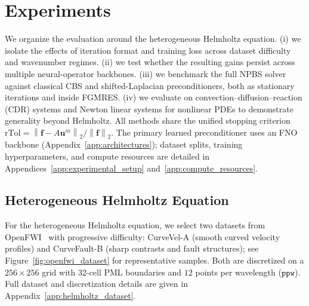 \documentclass{article}
\newcommand{\norm}[1]{\left\lVert #1 \right\rVert_2}
\theoremstyle{plain}
\theoremstyle{remark}
\begin{document}



\section{Experiments}
\label{sec:numerical_results}
We organize the evaluation around the heterogeneous Helmholtz equation. 
(i) we isolate the effects of iteration format and training loss across dataset difficulty and wavenumber regimes. 
(ii) we test whether the resulting gains persist across multiple neural-operator backbones. 
(iii) we benchmark the full NPBS solver against classical CBS and shifted-Laplacian preconditioners, both as stationary iterations and inside FGMRES. 
(iv) we evaluate on convection--diffusion--reaction (CDR) systems and Newton linear systems for nonlinear PDEs to demonstrate generality beyond Helmholtz. 
All methods share the unified stopping criterion $\mathrm{rTol}=\norm{\bm f-A\bm u^m}/\norm{\bm f}$.
The primary learned preconditioner uses an FNO backbone (Appendix~\ref{app:architectures}); dataset splits, training hyperparameters, and compute resources are detailed in Appendices~\ref{app:experimental_setup} and~\ref{app:compute_resources}.

\subsection{Heterogeneous Helmholtz Equation}
\label{sec:exp_heter_helm_eq}
For the heterogeneous Helmholtz equation, we select two datasets from OpenFWI~\cite{deng2022openfwi} with progressive difficulty: CurveVel-A (smooth curved velocity profiles) and CurveFault-B (sharp contrasts and fault structures); see Figure~\ref{fig:openfwi_dataset} for representative samples. Both are discretized on a $256\times256$ grid with 32-cell PML boundaries and $12$ points per wavelength ($\texttt{ppw}$). Full dataset and discretization details are given in Appendix~\ref{app:helmholtz_dataset}.
\end{document}
